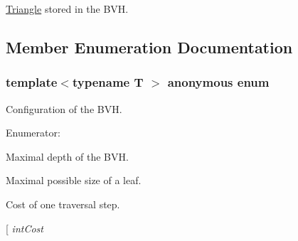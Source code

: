 \hyperlink{classembree_1_1_triangle}{Triangle} stored in the BVH. 



\subsection{Member Enumeration Documentation}
\hypertarget{classembree_1_1_b_v_h4_add8136d5156500f52137f7e347e874bb}{
\subsubsection[{"@6}]{\setlength{\rightskip}{0pt plus 5cm}template$<$typename T $>$ anonymous enum}}
\label{classembree_1_1_b_v_h4_add8136d5156500f52137f7e347e874bb}


Configuration of the BVH. 

\begin{Desc}
\item[Enumerator: ]\par
\begin{description}
\item[{\em 
\hypertarget{classembree_1_1_b_v_h4_add8136d5156500f52137f7e347e874bba1568a398c05b380fa769fedf230a242f}{
maxDepth}
\label{classembree_1_1_b_v_h4_add8136d5156500f52137f7e347e874bba1568a398c05b380fa769fedf230a242f}
}]Maximal depth of the BVH. \item[{\em 
\hypertarget{classembree_1_1_b_v_h4_add8136d5156500f52137f7e347e874bba5ea83bcc72e6bcfde0e4935dcafd23d0}{
maxLeafSize}
\label{classembree_1_1_b_v_h4_add8136d5156500f52137f7e347e874bba5ea83bcc72e6bcfde0e4935dcafd23d0}
}]Maximal possible size of a leaf. \item[{\em 
\hypertarget{classembree_1_1_b_v_h4_add8136d5156500f52137f7e347e874bba17534645e1e1864d3f0f63cf33bf4a70}{
travCost}
\label{classembree_1_1_b_v_h4_add8136d5156500f52137f7e347e874bba17534645e1e1864d3f0f63cf33bf4a70}
}]Cost of one traversal step. \item[{\em 
\hypertarget{classembree_1_1_b_v_h4_add8136d5156500f52137f7e347e874bba38049eb2b9a7d1e380280e93e48117bb}{
intCost}
\label{classembree_1_1_b_v_h4_add8136d5156500f52137f7e347e874bba38049eb2b9a7d1e380280e93e48117bb}
}
\end{description}
\end{Desc}
